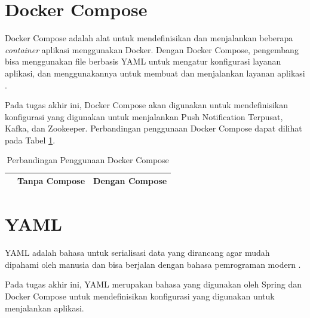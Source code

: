 \section{Docker Compose}
\par Docker Compose adalah alat untuk mendefinisikan dan menjalankan beberapa \textit{container} aplikasi menggunakan Docker. Dengan Docker Compose, pengembang bisa menggunakan file berbasis YAML untuk mengatur konfigurasi layanan aplikasi, dan menggunakannya untuk membuat dan menjalankan layanan aplikasi \cite{docker-compose-online}.
\par Pada tugas akhir ini, Docker Compose akan digunakan untuk mendefinisikan konfigurasi yang digunakan untuk menjalankan Push Notification Terpusat, Kafka, dan Zookeeper. Perbandingan penggunaan Docker Compose dapat dilihat pada Tabel \ref{t:perbandingan_docker_compose}.
\begin{longtable}{|p{2cm}|p{3.5cm}|p{3.5cm}|}
	\caption{Perbandingan Penggunaan Docker Compose} \label{t:perbandingan_docker_compose} \\ \hline
	\rowcolor{lightgray} & Tanpa Compose & Dengan Compose \\ \hline
\end{longtable}

\section{YAML}
\par YAML adalah bahasa untuk serialisasi data yang dirancang agar mudah dipahami oleh manusia dan bisa berjalan dengan bahasa pemrograman modern \cite{yaml-online}.
\par Pada tugas akhir ini, YAML merupakan bahasa yang digunakan oleh Spring dan Docker Compose untuk mendefinisikan konfigurasi yang digunakan untuk menjalankan aplikasi.
